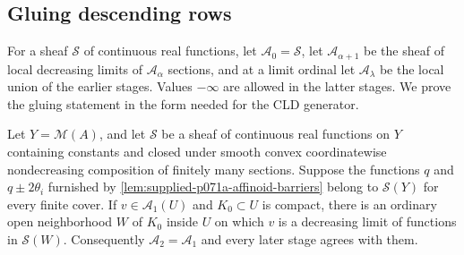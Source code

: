 \subsection{Gluing descending rows}
\label{sec:supplied-p071a-gluing}

For a sheaf $\mathscr{S}$ of continuous real functions, let $\mathscr{A}_0=\mathscr{S}$, let $\mathscr{A}_{\alpha+1}$ be the sheaf of local decreasing limits of $\mathscr{A}_\alpha$ sections, and at a limit ordinal let $\mathscr{A}_\lambda$ be the local union of the earlier stages. Values $-\infty$ are allowed in the latter stages. We prove the gluing statement in the form needed for the CLD generator.

\begin{proposition}
\label{prop:supplied-p071a-affinoid-gluing}
Let $Y=\mathcal{M}(A)$, and let $\mathscr{S}$ be a sheaf of continuous real functions on $Y$ containing constants and closed under smooth convex coordinatewise nondecreasing composition of finitely many sections. Suppose the functions $q$ and $q\pm2\theta_i$ furnished by \cref{lem:supplied-p071a-affinoid-barriers} belong to $\mathscr{S}(Y)$ for every finite cover. If $v\in\mathscr{A}_1(U)$ and $K_0\subset U$ is compact, there is an ordinary open neighborhood $W$ of $K_0$ inside $U$ on which $v$ is a decreasing limit of functions in $\mathscr{S}(W)$. Consequently $\mathscr{A}_2=\mathscr{A}_1$ and every later stage agrees with them.
\end{proposition}


